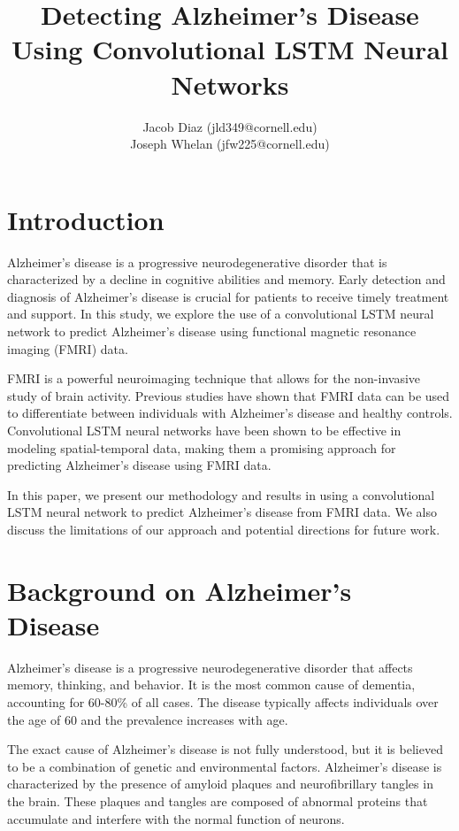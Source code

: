 \documentclass[10pt]{article}
\title{Detecting Alzheimer's Disease Using Convolutional LSTM Neural Networks}
\author{
  Jacob Diaz (jld349@cornell.edu) \\
  Joseph Whelan (jfw225@cornell.edu)
}
\begin{document}
 
	
	\maketitle
	
	\section{Introduction}

	Alzheimer's disease is a progressive neurodegenerative disorder that is characterized by a decline in cognitive abilities and memory. Early detection and diagnosis of Alzheimer's disease is crucial for patients to receive timely treatment and support. In this study, we explore the use of a convolutional LSTM neural network to predict Alzheimer's disease using functional magnetic resonance imaging (FMRI) data.

	FMRI is a powerful neuroimaging technique that allows for the non-invasive study of brain activity. Previous studies have shown that FMRI data can be used to differentiate between individuals with Alzheimer's disease and healthy controls. Convolutional LSTM neural networks have been shown to be effective in modeling spatial-temporal data, making them a promising approach for predicting Alzheimer's disease using FMRI data.

	In this paper, we present our methodology and results in using a convolutional LSTM neural network to predict Alzheimer's disease from FMRI data. We also discuss the limitations of our approach and potential directions for future work.

	\section{Background on Alzheimer's Disease}

	Alzheimer's disease is a progressive neurodegenerative disorder that affects memory, thinking, and behavior. It is the most common cause of dementia, accounting for 60-80\% of all cases. The disease typically affects individuals over the age of 60 and the prevalence increases with age.

	The exact cause of Alzheimer's disease is not fully understood, but it is believed to be a combination of genetic and environmental factors. Alzheimer's disease is characterized by the presence of amyloid plaques and neurofibrillary tangles in the brain. These plaques and tangles are composed of abnormal proteins that accumulate and interfere with the normal function of neurons.
\end{document}
